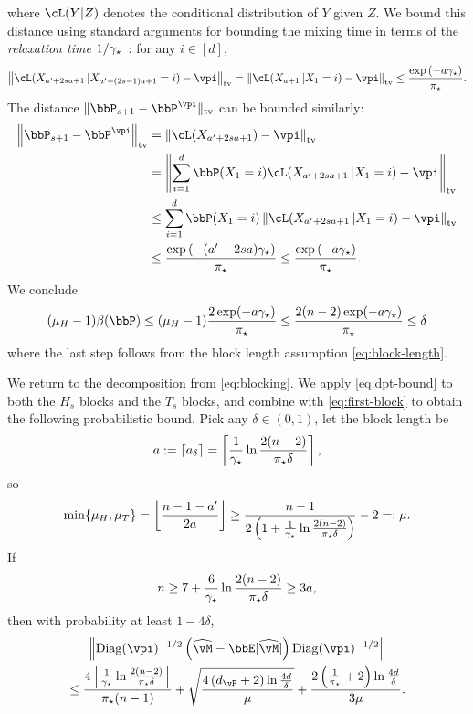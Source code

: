 where $\cL(Y|Z)$ denotes the conditional distribution of $Y$ given
$Z$.
We bound this distance using standard arguments for bounding the
mixing time in terms of the \emph{relaxation time}
$1/\gamma_{\star}$~\citep[see, e.g., the proof of Theorem 12.3 of][]{LePeWi08}:
for any $i \in [d]$,
\[
  \Norm{
    \cL(X_{a'+2sa+1}\,|X_{a'+(2s-1)a+1}=i)
    - \vpi
  }_{\tv}
  =
  \Norm{
    \cL(X_{a+1}\,|X_1=i)
    - \vpi
  }_{\tv}
  \leq
  \frac{
    \exp\Parens{ -a\gap }
  }{\pimin}
  .
\]
The distance $\norm{ \bbP_{s+1} - \bbP^{\vpi} }_{\tv}$ can be bounded
similarly:
\begin{align*}
  \Norm{
    \bbP_{s+1}
    - \bbP^{\vpi}
  }_{\tv}
  & =
  \Norm{
    \cL(X_{a'+2sa+1})
    - \vpi
  }_{\tv}
  \\
  & =
  \Norm{
    \sum_{i=1}^d \bbP(X_1 = i)
    \cL(X_{a'+2sa+1}\,|X_1 = i)
    - \vpi
  }_{\tv}
  \\
  & \leq
  \sum_{i=1}^d \bbP(X_1 = i)
  \Norm{
    \cL(X_{a'+2sa+1}\,|X_1 = i)
    - \vpi
  }_{\tv}
  \\
  & \leq
  \frac{
    \exp\Parens{-(a'+2sa)\gap}
  }{\pimin}
  \leq
  \frac{
    \exp\Parens{-a\gap}
  }{\pimin}
  .
\end{align*}
We conclude
\[
  (\mu_H-1)\beta(\bbP)
  \leq (\mu_H-1)\frac{2\exp(-a\gap)}{\pimin}
  \leq \frac{2(n-2)\exp(-a\gap)}{\pimin}
  \leq \delta
\]
where the last step follows from the block length assumption
\cref{eq:block-length}.


We return to the decomposition from \cref{eq:blocking}.
We apply \cref{eq:dpt-bound} to both the $H_s$ blocks and the $T_s$
blocks, and combine with \cref{eq:first-block} to obtain the following
probabilistic bound.
Pick any $\delta \in (0,1)$, let the block length be
\[
  a
  := \lceil a_\delta \rceil
  =
  \left\lceil
    \frac{1}{\gamma_{\star}}\ln\frac{2(n-2)}{\pi_{\star}\delta}
  \right\rceil
  ,
\]
so
\[
  \min\{\mu_H,\mu_T\}
  =
  \left\lfloor
    \frac{n-1-a'}{2a}
  \right\rfloor
  \geq
  \frac{n-1}
  {
    2\left(
      1 + \frac1{\gamma_{\star}}\ln\frac{2(n-2)}{\pi_{\star}\delta}
    \right)
  }
  -2
  =: \mu
  .
\]
If
\begin{equation}
  n \geq 7 + \frac6{\gamma_{\star}} \ln \frac{2(n-2)}{\pi_{\star}\delta}
  \geq 3a
  ,
  \label{eq:min-n2}
\end{equation}
then with probability at least $1-4\delta$,
\begin{multline*}
  \Norm{\Diag(\vpi)^{-1/2}\Parens{\wh\vM - \bbE[\wh\vM]} \Diag(\vpi)^{-1/2} }
  \\
  \leq
  \frac{4
    \Ceil{
      \frac{1}{\gap}\ln\frac{2(n-2)}{\pimin\delta}
    }
  }{\pimin(n-1)}
  +
  \sqrt{
    \frac{4\Parens{ d_{\vP} + 2 } \ln\frac{4d}{\delta}}
    {\mu}
  }
  + \frac{2\Parens{ \frac1{\pimin} + 2 } \ln\frac{4d}{\delta}}
  {3\mu}
  .
\end{multline*}

